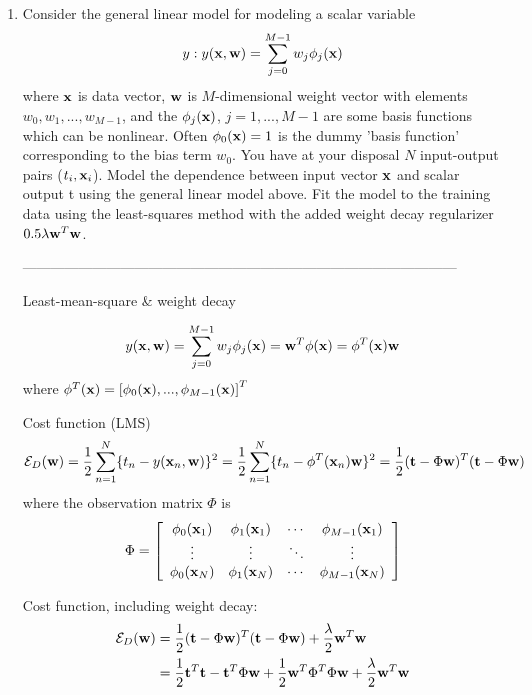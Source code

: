 \documentclass[10pt]{article}
\newcommand{\vect}[1]{{\bf{#1}}}
\begin{document}
\begin{enumerate}
\vspace{2mm}

\vspace{2cm}
\item Consider the general linear model for modeling a scalar variable \[y:
  y({\bf x},{\bf w}) = \sum_{j=0}^{M-1} w_j \phi_j({\bf x})\]
  where ${\bf x}$ is data vector, ${\bf w}$ is $M$-dimensional weight vector with
  elements $w_0,w_1,...,w_{M-1}$, and the $\phi_j({\bf x})$, $j=1,...,M-1$ are
  some basis functions which can be nonlinear. Often $\phi_0({\bf x})
  = 1$ is the dummy 'basis function' corresponding to the bias term $w_0$.
  You have at your disposal $N$ input-output pairs ($t_i,{\bf x}_i$). Model
  the dependence between input vector ${\bf x}$ and scalar output t using the
  general linear model above. Fit the model to the training data using
  the least-squares method with the added weight decay regularizer
  $0.5\lambda {\bf w}^T{\bf w}$.

---------------------------------------------------------------------------------------------

Least-mean-square \& weight decay

\[
y(\vect{x},\vect{w})=\sum_{j=0}^{M-1} w_j \phi_j(\vect{x}) = \vect{w}^T \phi(\vect{x}) = \phi^T(\vect{x})\vect{w}
\]
where $\phi^T(\vect{x}) = \left[ \phi_0(\vect{x}), ..., \phi_{M-1}(\vect{x})  \right]^T$

Cost function (LMS)
\[
\mathcal{E}_D(\vect{w}) = \frac{1}{2}\sum_{n=1}^{N} \lbrace t_n -
  y(\vect{x}_n,\vect{w}) \rbrace^2
=\frac{1}{2}\sum_{n=1}^{N} \lbrace t_n - \phi^T(\vect{x}_n)\vect{w} \rbrace^2
=\frac{1}{2} (\vect{t}-\Phi \vect{w})^T(\vect{t}-\Phi \vect{w})
\]
where the observation matrix $\Phi$ is
\begin{equation*}
\Phi =
\left[
\begin{array}{cccc}
\phi_0(\vect{x}_1) & \phi_1(\vect{x}_1) & \cdots & \phi_{M-1}(\vect{x}_1) \\
\vdots             & \vdots             & \ddots & \vdots  \\
\phi_0(\vect{x}_N) & \phi_1(\vect{x}_N) & \cdots & \phi_{M-1}(\vect{x}_N) \\
\end{array}
\right]
\end{equation*}

Cost function, including weight decay:
\[
\begin{split}
\mathcal{E}_D(\vect{w}) &= \frac{1}{2} (\vect{t}-\Phi \vect{w})^T(\vect{t}-\Phi
\vect{w}) + \frac{\lambda}{2} \vect{w}^T\vect{w}\\
&=\frac{1}{2}\vect{t}^T\vect{t} - \vect{t}^T\Phi \vect{w} + \frac{1}{2}\vect{w}^T\Phi^T \Phi
\vect{w} +\frac{\lambda}{2}\vect{w}^T\vect{w}
\end{split}
\]


\end{enumerate}
\end{document}
